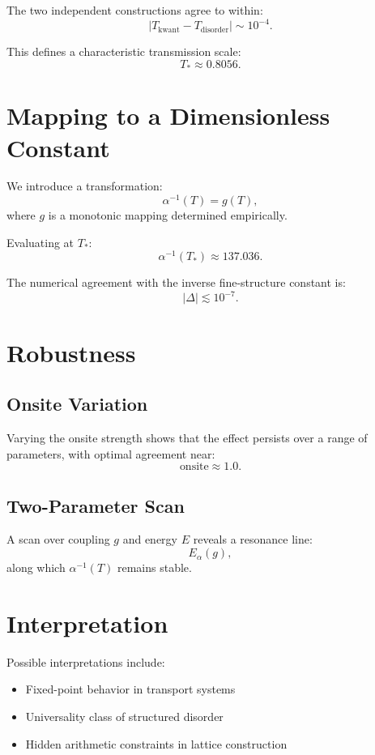 \documentclass[11pt]{article}
\begin{document}
The two independent constructions agree to within:
\[
|T_{\text{kwant}} - T_{\text{disorder}}| \sim 10^{-4}.
\]

This defines a characteristic transmission scale:
\[
T_* \approx 0.8056.
\]

\section{Mapping to a Dimensionless Constant}

We introduce a transformation:
\begin{equation}
\alpha^{-1}(T) = g(T),
\end{equation}
where $g$ is a monotonic mapping determined empirically.

Evaluating at $T_*$:
\[
\alpha^{-1}(T_*) \approx 137.036.
\]

The numerical agreement with the inverse fine-structure constant is:
\[
|\Delta| \lesssim 10^{-7}.
\]

\section{Robustness}

\subsection{Onsite Variation}

Varying the onsite strength shows that the effect persists over a range of parameters, with optimal agreement near:
\[
\text{onsite} \approx 1.0.
\]

\subsection{Two-Parameter Scan}

A scan over coupling $g$ and energy $E$ reveals a resonance line:
\[
E_\alpha(g),
\]
along which $\alpha^{-1}(T)$ remains stable.

\section{Interpretation}

Possible interpretations include:

\begin{itemize}
\item Fixed-point behavior in transport systems
\item Universality class of structured disorder
\item Hidden arithmetic constraints in lattice construction
\end{itemize}
\end{document}
